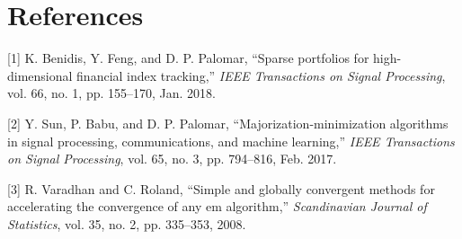\documentclass[]{article}
\begin{document}
\section*{References}\label{references}

\setlength{\parindent}{-0.2in} \setlength{\leftskip}{0.2in}
\setlength{\parskip}{8pt} \noindent

\hypertarget{refs}{}
\hypertarget{ref-BenFengPal2018}{}
{[}1{]} K. Benidis, Y. Feng, and D. P. Palomar, ``Sparse portfolios for
high-dimensional financial index tracking,'' \emph{IEEE Transactions on
Signal Processing}, vol. 66, no. 1, pp. 155--170, Jan. 2018.

\hypertarget{ref-SunBabPal2018}{}
{[}2{]} Y. Sun, P. Babu, and D. P. Palomar, ``Majorization-minimization
algorithms in signal processing, communications, and machine learning,''
\emph{IEEE Transactions on Signal Processing}, vol. 65, no. 3, pp.
794--816, Feb. 2017.

\hypertarget{ref-Varadhan2008}{}
{[}3{]} R. Varadhan and C. Roland, ``Simple and globally convergent
methods for accelerating the convergence of any em algorithm,''
\emph{Scandinavian Journal of Statistics}, vol. 35, no. 2, pp. 335--353,
2008.
\end{document}
